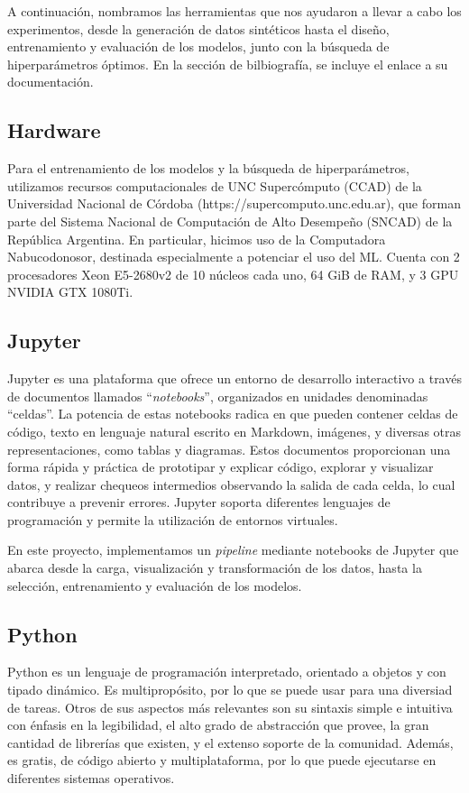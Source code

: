 \documentclass[../../main.tex]{subfiles}
\begin{document}
A continuación, nombramos las herramientas que nos ayudaron a llevar a cabo los
experimentos, desde la generación de datos sintéticos hasta el diseño, entrenamiento y
evaluación de los modelos, junto con la búsqueda de hiperparámetros óptimos. En la
sección de bilbiografía, se incluye el enlace a su documentación.

\subsection{Hardware}
Para el entrenamiento de los modelos y la búsqueda de hiperparámetros, utilizamos recursos
computacionales de UNC Supercómputo (CCAD) de la Universidad Nacional de Córdoba
(https://supercomputo.unc.edu.ar), que forman parte del Sistema Nacional de Computación de
Alto Desempeño (SNCAD) de la República Argentina. En particular, hicimos uso de la
Computadora Nabucodonosor, destinada especialmente a potenciar el uso del ML. Cuenta con 2
procesadores Xeon E5-2680v2 de 10 núcleos cada uno, 64 GiB de RAM, y 3 GPU NVIDIA GTX
1080Ti.

\subsection{Jupyter}
Jupyter es una plataforma que ofrece un entorno de desarrollo interactivo a través de
documentos llamados ``\textit{notebooks}'', organizados en unidades denominadas ``celdas''.
La potencia de estas notebooks radica en que pueden contener celdas de código, texto en
lenguaje natural escrito en Markdown, imágenes, y diversas otras representaciones, como
tablas y diagramas. Estos documentos proporcionan una forma rápida y práctica de
prototipar y explicar código, explorar y visualizar datos, y realizar chequeos intermedios
observando la salida de cada celda, lo cual contribuye a prevenir errores. Jupyter soporta
diferentes lenguajes de programación y permite la utilización de entornos virtuales.

En este proyecto, implementamos un \textit{pipeline} mediante notebooks de Jupyter que
abarca desde la carga, visualización y transformación de los datos, hasta la selección,
entrenamiento y evaluación de los modelos.

\subsection{Python}
Python es un lenguaje de programación interpretado, orientado a objetos y con tipado
dinámico. Es multipropósito, por lo que se puede usar para una diversiad de tareas. Otros
de sus aspectos más relevantes son su sintaxis simple e intuitiva con énfasis en la
legibilidad, el alto grado de abstracción que provee, la gran cantidad de librerías que
existen, y el extenso soporte de la comunidad. Además, es gratis, de código abierto y
multiplataforma, por lo que puede ejecutarse en diferentes sistemas operativos.
\end{document}
